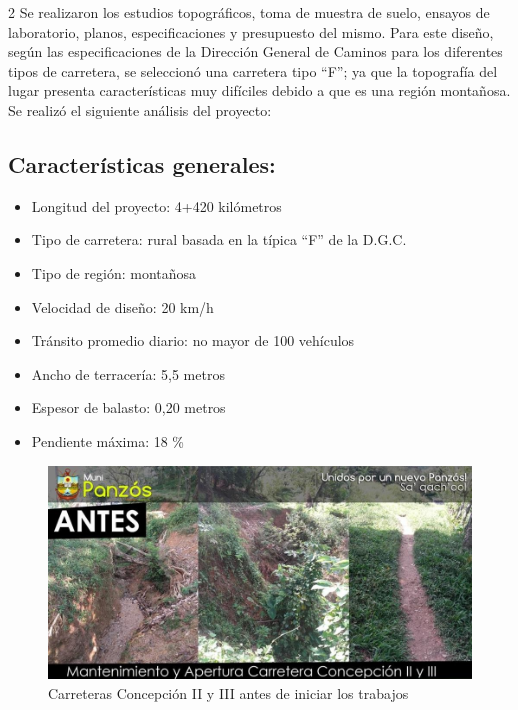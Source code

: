 \documentclass[12pt,spanish,Letterpaper,openany]{book}
\providecommand{\tightlist}{%
  \setlength{\itemsep}{0pt}\setlength{\parskip}{0pt}}
\newcommand{\spacetwominus}{\vspace{-2mm}}
\begin{document}
\begin {multicols*}{2}
Se realizaron los estudios topográficos, toma de muestra de suelo, ensayos de laboratorio, planos, especificaciones y presupuesto del mismo.
Para este diseño, según las especificaciones de la Dirección General de Caminos para los diferentes tipos de carretera, se seleccionó una carretera tipo ``F''; ya que la topografía del lugar presenta características muy difíciles debido a que es una región montañosa. Se realizó el siguiente análisis del proyecto:

\spacetwominus
\spacetwominus

\hypertarget{caracteristicas-generales}{%
\subsection{Características generales:}\label{caracteristicas-generales}}

\spacetwominus

\begin{itemize}
\tightlist
\item
  Longitud del proyecto: 4+420 kilómetros
\item
  Tipo de carretera: rural basada en la típica ``F'' de la D.G.C.
\item
  Tipo de región: montañosa
\item
  Velocidad de diseño: 20 km/h
\item
  Tránsito promedio diario: no mayor de 100 vehículos
\item
  Ancho de terracería: 5,5 metros
\item
  Espesor de balasto: 0,20 metros
\item
  Pendiente máxima: 18 \%
\end{itemize}

\end {multicols*}

\begin{figure}[H]

{\centering \includegraphics[width=0.8\linewidth]{images/image02_mgarcia} 

}

\caption{Carreteras Concepción II y III antes de iniciar los trabajos}\label{fig:unnamed-chunk-16}
\end{figure}
\end{document}

